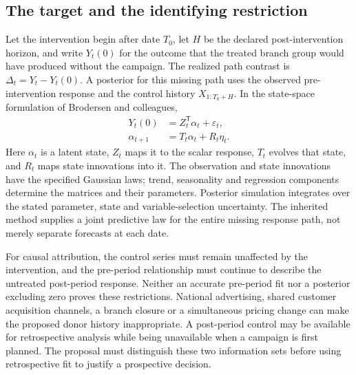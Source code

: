 \subsection{The target and the identifying restriction}

Let the intervention begin after date \(T_0\), let \(H\) be the declared
post-intervention horizon, and write \(Y_t(0)\) for the outcome that the
treated branch group would have produced without the campaign. The realized
path contrast is \(\Delta_t=Y_t-Y_t(0)\). A posterior for this missing path
uses the observed pre-intervention response and the control history
\(X_{1:T_0+H}\). In the state-space formulation of Brodersen and colleagues,
\begin{align}
 Y_t(0)&=Z_t^{\mathsf T}\alpha_t+\varepsilon_t,\\
 \alpha_{t+1}&=T_t\alpha_t+R_t\eta_t.
\end{align}
Here \(\alpha_t\) is a latent state, \(Z_t\) maps it to the scalar response,
\(T_t\) evolves that state, and \(R_t\) maps state innovations into it.
The observation and state innovations have the specified Gaussian laws;
trend, seasonality and regression components determine the matrices and
their parameters. Posterior simulation integrates over the stated parameter,
state and variable-selection uncertainty. The inherited method supplies a
joint predictive law for the entire missing response path, not merely
separate forecasts at each date. \cite{exec13_ci_brodersen2015}

For causal attribution, the control series must remain unaffected by the
intervention, and the pre-period relationship must continue to describe the
untreated post-period response. Neither an accurate pre-period fit nor a
posterior excluding zero proves these restrictions. National advertising,
shared customer acquisition channels, a branch closure or a simultaneous
pricing change can make the proposed donor history inappropriate. A
post-period control may be available for retrospective analysis while being
unavailable when a campaign is first planned. The proposal must distinguish
these two information sets before using retrospective fit to justify a
prospective decision. \cite{exec13_ci_r,exec13_ci_brodersen2015}

